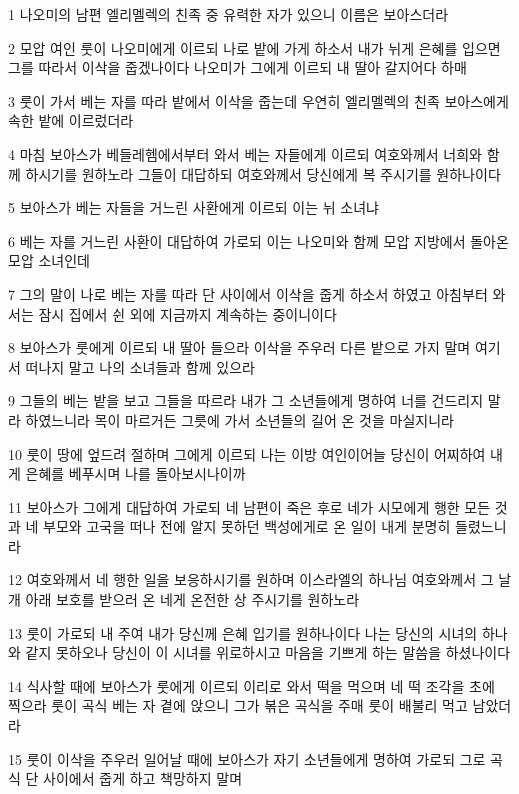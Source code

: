 \par 1 나오미의 남편 엘리멜렉의 친족 중 유력한 자가 있으니 이름은 보아스더라
\par 2 모압 여인 룻이 나오미에게 이르되 나로 밭에 가게 하소서 내가 뉘게 은혜를 입으면 그를 따라서 이삭을 줍겠나이다 나오미가 그에게 이르되 내 딸아 갈지어다 하매
\par 3 룻이 가서 베는 자를 따라 밭에서 이삭을 줍는데 우연히 엘리멜렉의 친족 보아스에게 속한 밭에 이르렀더라
\par 4 마침 보아스가 베들레헴에서부터 와서 베는 자들에게 이르되 여호와께서 너희와 함께 하시기를 원하노라 그들이 대답하되 여호와께서 당신에게 복 주시기를 원하나이다
\par 5 보아스가 베는 자들을 거느린 사환에게 이르되 이는 뉘 소녀냐
\par 6 베는 자를 거느린 사환이 대답하여 가로되 이는 나오미와 함께 모압 지방에서 돌아온 모압 소녀인데
\par 7 그의 말이 나로 베는 자를 따라 단 사이에서 이삭을 줍게 하소서 하였고 아침부터 와서는 잠시 집에서 쉰 외에 지금까지 계속하는 중이니이다
\par 8 보아스가 룻에게 이르되 내 딸아 들으라 이삭을 주우러 다른 밭으로 가지 말며 여기서 떠나지 말고 나의 소녀들과 함께 있으라
\par 9 그들의 베는 밭을 보고 그들을 따르라 내가 그 소년들에게 명하여 너를 건드리지 말라 하였느니라 목이 마르거든 그릇에 가서 소년들의 길어 온 것을 마실지니라
\par 10 룻이 땅에 엎드려 절하며 그에게 이르되 나는 이방 여인이어늘 당신이 어찌하여 내게 은혜를 베푸시며 나를 돌아보시나이까
\par 11 보아스가 그에게 대답하여 가로되 네 남편이 죽은 후로 네가 시모에게 행한 모든 것과 네 부모와 고국을 떠나 전에 알지 못하던 백성에게로 온 일이 내게 분명히 들렸느니라
\par 12 여호와께서 네 행한 일을 보응하시기를 원하며 이스라엘의 하나님 여호와께서 그 날개 아래 보호를 받으러 온 네게 온전한 상 주시기를 원하노라
\par 13 룻이 가로되 내 주여 내가 당신께 은혜 입기를 원하나이다 나는 당신의 시녀의 하나와 같지 못하오나 당신이 이 시녀를 위로하시고 마음을 기쁘게 하는 말씀을 하셨나이다
\par 14 식사할 때에 보아스가 룻에게 이르되 이리로 와서 떡을 먹으며 네 떡 조각을 초에 찍으라 룻이 곡식 베는 자 곁에 앉으니 그가 볶은 곡식을 주매 룻이 배불리 먹고 남았더라
\par 15 룻이 이삭을 주우러 일어날 때에 보아스가 자기 소년들에게 명하여 가로되 그로 곡식 단 사이에서 줍게 하고 책망하지 말며
